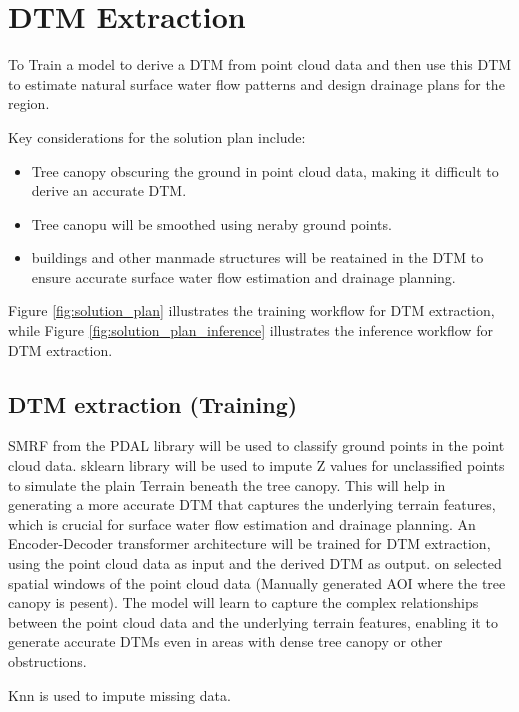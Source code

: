 \section{DTM Extraction}

To Train a model to derive a DTM from point cloud data and then use this DTM to estimate natural surface water flow patterns and design drainage plans for the region.

Key considerations for the solution plan include:
\begin{itemize}
	\item Tree canopy obscuring the ground in point cloud data, making it difficult to derive an accurate DTM.
	\item Tree canopu will be smoothed using neraby ground points.
	\item buildings and other manmade structures will be reatained in the DTM to ensure accurate surface water flow estimation and drainage planning.
\end{itemize}

Figure \ref{fig:solution_plan} illustrates the training workflow for DTM extraction, while Figure \ref{fig:solution_plan_inference} illustrates the inference workflow for DTM extraction. 


\subsection{DTM extraction (Training)}

\ac{SMRF}\cite{SMRF} from the PDAL library will be used to classify ground points in the point cloud data. 
sklearn library will be used to impute Z values for unclassified points to simulate the plain Terrain beneath the tree canopy. 
This will help in generating a more accurate DTM that captures the underlying terrain features, which is crucial for surface water flow estimation and drainage planning.
An Encoder-Decoder transformer architecture will be trained for DTM extraction, using the point cloud data as input and the derived DTM as output. on selected spatial windows of the point cloud data (Manually generated AOI where the tree canopy is pesent).
The model will learn to capture the complex relationships between the point cloud data and the underlying terrain features, enabling it to generate accurate DTMs even in areas with dense tree canopy or other obstructions.

\ac{Knn} \cite{knn} is used to impute missing data.

